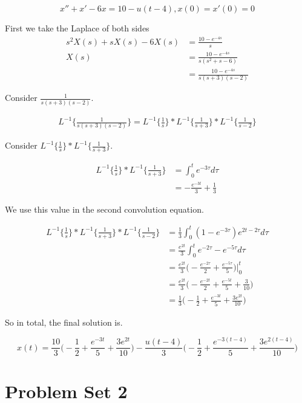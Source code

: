 \documentclass[titlepage]{article}
\begin{document}
$$x'' + x' - 6x = 10 - u(t - 4), x(0) = x'(0) = 0$$

First we take the Laplace of both sides
\begin{align*}
    s^2X(s) + sX(s) - 6X(s) &= \frac{10 - e^{-4s}}{s}
    \\ X(s) &= \frac{10 - e^{-4s}}{s(s^2 + s - 6)}
    \\ &= \frac{10 - e^{-4s}}{s(s+3)(s-2)}
\end{align*}

Consider $\frac{1}{s(s+3)(s-2)}$.

\begin{align*}
    L^{-1}\{\frac{1}{s(s+3)(s-2)}\} = L^{-1}\{\frac{1}{s}\} * L^{-1}\{\frac{1}{s+3}\} * L^{-1}\{\frac{1}{s-2}\}
\end{align*}

Consider $L^{-1}\{\frac{1}{s}\} * L^{-1}\{\frac{1}{s+3}\}$.

\begin{align*}
    L^{-1}\{\frac{1}{s}\} * L^{-1}\{\frac{1}{s+3}\} &= \int_0^t e^{-3\tau} d\tau
    \\ &= -\frac{e^{-3t}}{3} + \frac{1}{3}
\end{align*}

We use this value in the second convolution equation.

\begin{align*}
    L^{-1}\{\frac{1}{s}\} * L^{-1}\{\frac{1}{s+3}\} * L^{-1}\{\frac{1}{s-2}\}
    &= \frac{1}{3}\int_0^t (1 - e^{-3\tau})e^{2t - 2\tau} d\tau
    \\ &= \frac{e^{2t}}{3}\int_0^t e^{-2\tau} - e^{-5\tau} d\tau
    \\ &= \frac{e^{2t}}{3} \bigg(-\frac{e^{-2\tau}}{2} + \frac{e^{-5\tau}}{5}\bigg) \bigg|_0^t
    \\ &= \frac{e^{2t}}{3} \bigg(-\frac{e^{-2t}}{2} + \frac{e^{-5t}}{5} + \frac{3}{10}\bigg)
    \\ &= \frac{1}{3} \bigg(-\frac{1}{2} + \frac{e^{-3t}}{5} + \frac{3e^{2t}}{10}\bigg)
\end{align*}

So in total, the final solution is.

$$x(t) = \frac{10}{3}\bigg(-\frac{1}{2} + \frac{e^{-3t}}{5} + \frac{3e^{2t}}{10}\bigg) - \frac{u(t - 4)}{3}\bigg(-\frac{1}{2} + \frac{e^{-3(t - 4)}}{5} + \frac{3e^{2(t - 4)}}{10}\bigg)$$

\section*{Problem Set 2}
\end{document}
